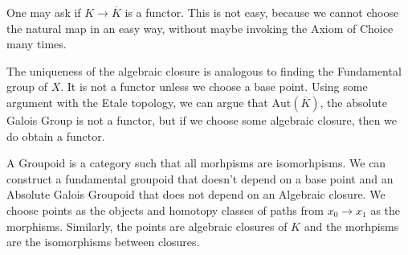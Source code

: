 \documentclass[11pt]{scrartcl}
\begin{document}
 One may ask if $K \to \overline{K}$ is a functor.  This is not easy, because we cannot choose the natural map in an easy way, without maybe invoking the Axiom of Choice many times.
 
 The uniqueness of the algebraic closure is analogous to finding the Fundamental group of $X$.  It is not a functor unless we choose a base point.  Using some argument with the Etale topology, we can argue that $\text{Aut}(\overline{K})$, the absolute Galois Group is not a functor, but if we choose some algebraic closure, then we do obtain a functor.
 
 A Groupoid is a category such that all morhpisms are isomorhpisms.  We can construct a fundamental groupoid that doesn't depend on a base point and an Absolute Galois Groupoid that does not depend on an Algebraic closure.  We choose points as the objects and homotopy classes of paths from $x_0 \to x_1$ as the morphisms.  Similarly, the points are algebraic closures of $K$ and the morhpisms are the isomorphisms between closures.
\end{document}
